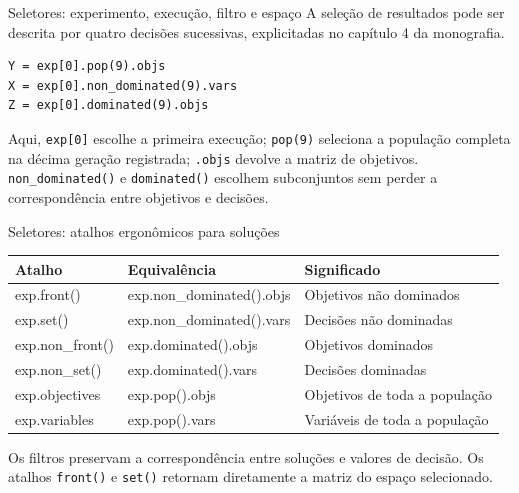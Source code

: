 \begin{frame}[fragile]{Seletores: experimento, execução, filtro e espaço}
A seleção de resultados pode ser descrita por quatro decisões sucessivas, explicitadas no capítulo 4 da monografia.
\begin{center}
\end{center}
\begin{lstlisting}[style=python,basicstyle=\ttfamily\fontsize{8}{10}\selectfont]
Y = exp[0].pop(9).objs
X = exp[0].non_dominated(9).vars
Z = exp[0].dominated(9).objs
\end{lstlisting}
Aqui, \texttt{exp[0]} escolhe a primeira execução; \texttt{pop(9)} seleciona a população completa na décima geração registrada; \texttt{.objs} devolve a matriz de objetivos. \texttt{non\_dominated()} e \texttt{dominated()} escolhem subconjuntos sem perder a correspondência entre objetivos e decisões.
\end{frame}

\begin{frame}{Seletores: atalhos ergonômicos para soluções}
\begin{tabularx}{\linewidth}{@{}>{\ttfamily}p{.31\linewidth}>{\ttfamily}p{.38\linewidth}X@{}}
\textnormal{Atalho} & \textnormal{Equivalência} & \textnormal{Significado}\\\hline
exp.front() & exp.non\_dominated().objs & Objetivos não dominados\\[8pt]
exp.set() & exp.non\_dominated().vars & Decisões não dominadas\\[8pt]
exp.non\_front() & exp.dominated().objs & Objetivos dominados\\[8pt]
exp.non\_set() & exp.dominated().vars & Decisões dominadas\\[8pt]
exp.objectives & exp.pop().objs & Objetivos de toda a população\\[8pt]
exp.variables & exp.pop().vars & Variáveis de toda a população\\
\end{tabularx}
\vspace{.26cm}
Os filtros preservam a correspondência entre soluções e valores de decisão. Os atalhos \texttt{front()} e \texttt{set()} retornam diretamente a matriz do espaço selecionado.
\end{frame}

